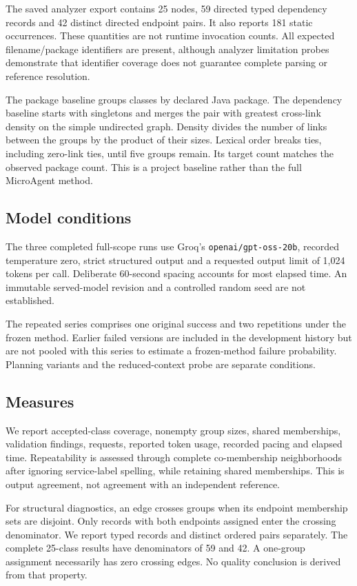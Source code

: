 The saved analyzer export contains 25 nodes, 59 directed typed dependency records and 42 distinct directed endpoint pairs. It also reports 181 static occurrences. These quantities are not runtime invocation counts. All expected filename/package identifiers are present, although analyzer limitation probes demonstrate that identifier coverage does not guarantee complete parsing or reference resolution.

The package baseline groups classes by declared Java package. The dependency baseline starts with singletons and merges the pair with greatest cross-link density on the simple undirected graph. Density divides the number of links between the groups by the product of their sizes. Lexical order breaks ties, including zero-link ties, until five groups remain. Its target count matches the observed package count. This is a project baseline rather than the full MicroAgent method.

\subsection{Model conditions}

The three completed full-scope runs use Groq's \texttt{openai/gpt-oss-20b}, recorded temperature zero, strict structured output and a requested output limit of 1,024 tokens per call. Deliberate 60-second spacing accounts for most elapsed time. An immutable served-model revision and a controlled random seed are not established.

The repeated series comprises one original success and two repetitions under the frozen method. Earlier failed versions are included in the development history but are not pooled with this series to estimate a frozen-method failure probability. Planning variants and the reduced-context probe are separate conditions.

\subsection{Measures}

We report accepted-class coverage, nonempty group sizes, shared memberships, validation findings, requests, reported token usage, recorded pacing and elapsed time. Repeatability is assessed through complete co-membership neighborhoods after ignoring service-label spelling, while retaining shared memberships. This is output agreement, not agreement with an independent reference.

For structural diagnostics, an edge crosses groups when its endpoint membership sets are disjoint. Only records with both endpoints assigned enter the crossing denominator. We report typed records and distinct ordered pairs separately. The complete 25-class results have denominators of 59 and 42. A one-group assignment necessarily has zero crossing edges. No quality conclusion is derived from that property.


